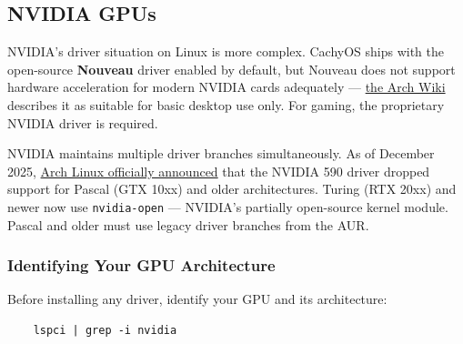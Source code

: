 \documentclass{article}
\newcommand{\code}[1]{\colorbox{codebg}{\texttt{#1}}}
\begin{document}
\subsection{NVIDIA GPUs}

NVIDIA's driver situation on Linux is more complex. CachyOS ships with the
open-source \textbf{Nouveau} driver enabled by default, but Nouveau does not
support hardware acceleration for modern NVIDIA cards adequately ---
\href{https://wiki.archlinux.org/title/Nouveau}{the Arch Wiki} describes it as
suitable for basic desktop use only. For gaming, the proprietary NVIDIA driver
is required.

\begin{tcolorbox}[arc=12pt, outer arc=10pt,
	colback=blue!4!white, colframe=blue!40!black,
	title=\textbf{NVIDIA Driver Landscape (2025--2026)}]
	NVIDIA maintains multiple driver branches simultaneously. As of December 2025,
	\href{https://archlinux.org/news/nvidia-590-driver-drops-pascal-support-main-packages-switch-to-open-kernel-modules/}{Arch
		Linux officially announced} that the NVIDIA 590 driver dropped support for Pascal
	(GTX 10xx) and older architectures. Turing (RTX 20xx) and newer now use
	\code{nvidia-open} --- NVIDIA's partially open-source kernel module. Pascal and
	older must use legacy driver branches from the AUR.
\end{tcolorbox}

\subsubsection{Identifying Your GPU Architecture}

Before installing any driver, identify your GPU and its architecture:

\begin{verbatim}
	lspci | grep -i nvidia
\end{verbatim}
\end{document}

